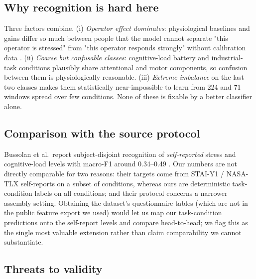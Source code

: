 \documentclass{llncs}
\begin{document}
\subsection{Why recognition is hard here}

Three factors combine. (i) \emph{Operator effect dominates}: physiological baselines
and gains differ so much between people that the model cannot separate "this operator
is stressed" from "this operator responds strongly" without calibration data
\cite{aygun2022assistive,borghi2025operatorstress}. (ii) \emph{Coarse but confusable
classes}: cognitive-load battery and industrial-task conditions plausibly share
attentional and motor components, so confusion between them is physiologically
reasonable. (iii) \emph{Extreme imbalance} on the last two classes makes them
statistically near-impossible to learn from 224 and 71 windows spread over few
conditions. None of these is fixable by a better classifier alone.

\subsection{Comparison with the source protocol}

Bussolan et al.\ report subject-disjoint recognition of \emph{self-reported} stress
and cognitive-load levels with macro-F1 around 0.34--0.49
\cite{bussolan2025multiphysiohrc,bussolan2024stressdetector}. Our numbers are not
directly comparable for two reasons: their targets come from STAI-Y1 / NASA-TLX
self-reports on a subset of conditions, whereas ours are deterministic task-condition
labels on all conditions; and their protocol concerns a narrower assembly setting.
Obtaining the dataset's questionnaire tables (which are not in the public feature
export we used) would let us map our task-condition predictions onto the
self-report levels and compare head-to-head; we flag this as the single most valuable
extension rather than claim comparability we cannot substantiate.

\subsection{Threats to validity}
\end{document}
